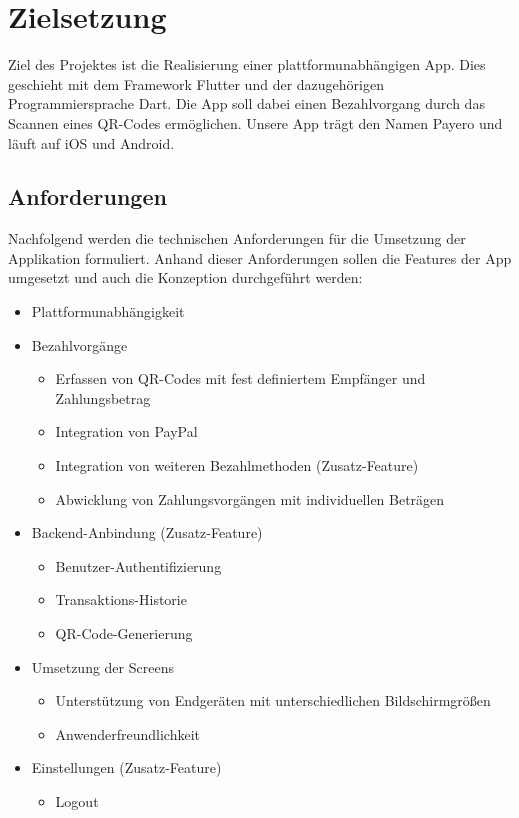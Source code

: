 
\chapter{Zielsetzung}

Ziel des Projektes ist die Realisierung einer plattformunabhängigen App.
Dies geschieht mit dem Framework Flutter und der dazugehörigen Programmiersprache Dart.
Die App soll dabei einen Bezahlvorgang durch das Scannen eines QR-Codes ermöglichen.
Unsere App trägt den Namen \glqq Payero\grqq{} und läuft auf iOS und Android.

\section{Anforderungen}

Nachfolgend werden die technischen Anforderungen für die Umsetzung der Applikation formuliert.
Anhand dieser Anforderungen sollen die Features der App umgesetzt und auch die Konzeption durchgeführt werden:

\begin{itemize}
    \item Plattformunabhängigkeit
    \item Bezahlvorgänge
    \begin{itemize}
        \item Erfassen von QR-Codes mit fest definiertem Empfänger und Zahlungsbetrag
        \item Integration von PayPal
        \item Integration von weiteren Bezahlmethoden (Zusatz-Feature)
        \item Abwicklung von Zahlungsvorgängen mit individuellen Beträgen
    \end{itemize}
    \item Backend-Anbindung (Zusatz-Feature)
    \begin{itemize}
        \item Benutzer-Authentifizierung
        \item Transaktions-Historie
        \item QR-Code-Generierung
    \end{itemize}
    \item Umsetzung der Screens
    \begin{itemize}
            \item Unterstützung von Endgeräten mit unterschiedlichen Bildschirmgrößen
            \item Anwenderfreundlichkeit
    \end{itemize}
    \item Einstellungen (Zusatz-Feature)
    \begin{itemize}
        \item Logout
    \end{itemize}
\end{itemize}

